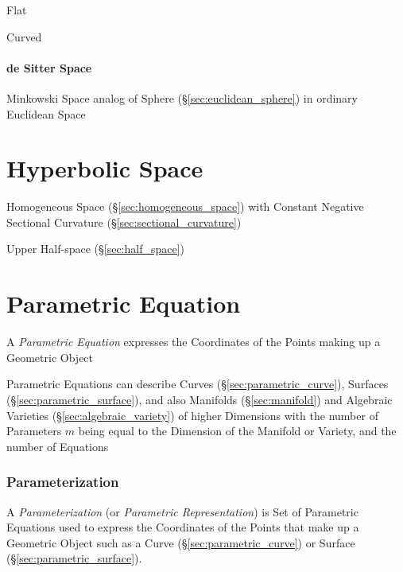 Flat

Curved



\paragraph{de Sitter Space}\label{sec:desitter_space}\hfill

Minkowski Space analog of Sphere (\S\ref{sec:euclidean_sphere}) in ordinary
Euclidean Space



\section{Hyperbolic Space}\label{sec:hyperbolic_space}

Homogeneous Space (\S\ref{sec:homogeneous_space}) with Constant Negative
Sectional Curvature (\S\ref{sec:sectional_curvature})

Upper Half-space (\S\ref{sec:half_space})



\section{Parametric Equation}\label{sec:parametric_equation}

A \emph{Parametric Equation} expresses the Coordinates of the Points making up a
Geometric Object

Parametric Equations can describe Curves (\S\ref{sec:parametric_curve}),
Surfaces (\S\ref{sec:parametric_surface}), and also Manifolds
(\S\ref{sec:manifold}) and Algebraic Varieties (\S\ref{sec:algebraic_variety})
of higher Dimensions with the number of Parameters $m$ being equal to the
Dimension of the Manifold or Variety, and the number of Equations



\subsubsection{Parameterization}\label{sec:parameterization}

A \emph{Parameterization} (or \emph{Parametric Representation}) is Set of
Parametric Equations used to express the Coordinates of the Points that make up
a Geometric Object such as a Curve (\S\ref{sec:parametric_curve}) or Surface
(\S\ref{sec:parametric_surface}).

